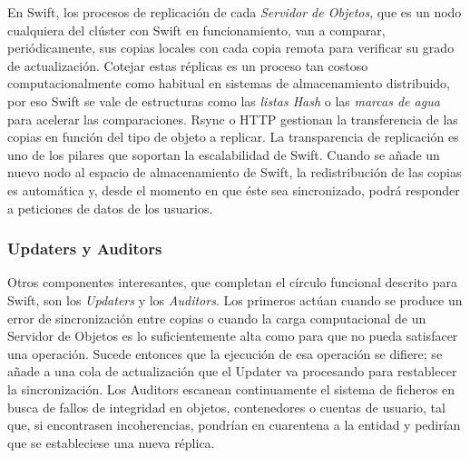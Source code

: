 En Swift, los procesos de replicaci\'on de cada \emph{Servidor de Objetos}, que es un nodo cualquiera del cl\'uster con Swift en funcionamiento, van a comparar, peri\'odicamente, sus copias locales con cada copia remota para verificar su grado de actualizaci\'on. Cotejar estas r\'eplicas es un proceso tan costoso computacionalmente como habitual en sistemas de almacenamiento distribuido, por eso Swift se vale de estructuras como las \emph{listas Hash} o las \emph{marcas de agua} para acelerar las comparaciones. Rsync o HTTP gestionan la trans\-fe\-ren\-cia de las copias en funci\'on del tipo de objeto a replicar. La transparencia de replicaci\'on es uno de los pilares que soportan la escalabilidad de Swift. Cuando se a\~nade un nuevo nodo al espacio de almacenamiento de Swift, la redistribuci\'on de las copias es autom\'atica y, desde el momento en que \'este sea sincronizado, podr\'a responder a peticiones de datos de los usuarios.

\subsubsection{Updaters y Auditors}\label{subsubsec:otroscompswift}
\noindent Otros componentes interesantes, que completan el c\'irculo funcional descrito para Swift, son los \emph{Updaters} y los \emph{Auditors}. Los primeros act\'uan cuando se produce un error de sincronizaci\'on entre copias o cuando la carga computacional de un Servidor de Objetos es lo suficientemente alta como para que no pueda satisfacer una operaci\'on. Sucede entonces que la ejecuci\'on de esa operaci\'on se difiere; se a\~nade a una cola de actualizaci\'on que el Updater va procesando para restablecer la sincronizaci\'on. Los Auditors escanean continuamente el sistema de ficheros en busca de fallos de integridad en objetos, contenedores o cuentas de usuario, tal que, si encontrasen incoherencias, pondr\'ian en cuarentena a la entidad y pedir\'ian que se estableciese una nueva r\'eplica.

